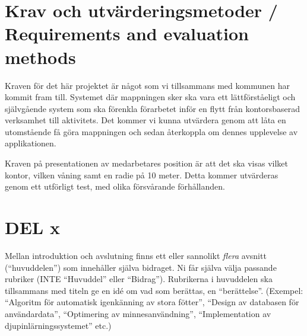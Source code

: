 \documentclass[a4paper,12pt]{article}
\begin{document}
\section{Krav och utvärderingsmetoder / Requirements and evaluation methods}\label{sec:krav}

%
%
%
%
%
Kraven för det här projektet är något som vi tillsammans med kommunen har kommit fram till. Systemet där mappningen sker ska vara ett lättförståeligt och självgående system som ska förenkla förarbetet inför en flytt från kontorsbaserad verksamhet till aktivitets. Det kommer vi kunna utvärdera genom att låta en utomstående få göra mappningen och sedan återkoppla om dennes upplevelse av applikationen.

Kraven på presentationen av medarbetares position är att det ska visas vilket kontor, vilken våning samt en radie på 10 meter. Detta kommer utvärderas genom ett utförligt test, med olika försvårande förhållanden.


\section{DEL x}\label{sec:delX}
Mellan introduktion och avslutning finns ett eller sannolikt \emph{flera} avsnitt (``huvuddelen'') som innehåller själva bidraget.  Ni får själva välja passande rubriker (INTE ``Huvuddel'' eller ``Bidrag'').  Rubrikerna i huvuddelen ska tillsammans med titeln ge en idé om vad som berättas, en ``berättelse''. (Exempel: ``Algoritm för automatisk igenkänning av stora fötter'', ``Design av databasen för användardata'', ``Optimering av minnesanvändning'', ``Implementation av djupinlärningssystemet'' etc.)
\end{document}
